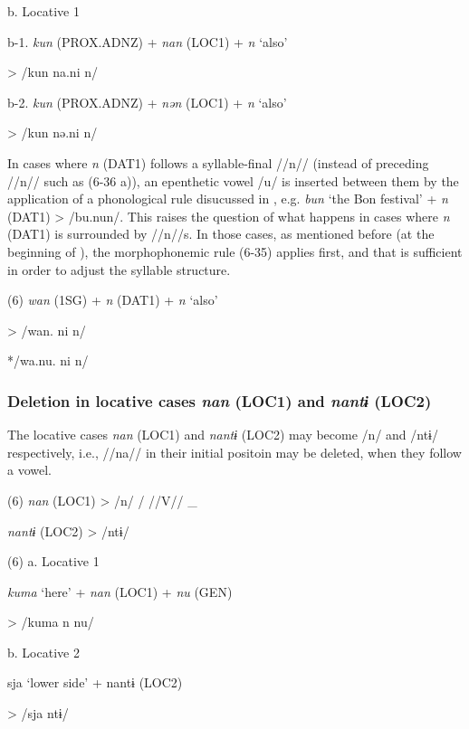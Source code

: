   b.  Locative 1

  b-1.  \textit{kun}  (PROX.ADNZ)  +  \textit{nan}  (LOC1)  +  \textit{n}  ‘also’

  >  /kun      na.ni      n/  

  b-2.  \textit{kun}  (PROX.ADNZ)  +  \textit{nən}  (LOC1)  +  \textit{n}  ‘also’

  >  /kun      nə.ni      n/  

In cases where \textit{n} (DAT1) follows a syllable-final //n// (instead of preceding //n// such as (6-36 a)), an epenthetic vowel /u/ is inserted between them by the application of a phonological rule disucussed in , e.g. \textit{bun} ‘the Bon festival’ + \textit{n} (DAT1) > /bu.nun/. This raises the question of what happens in cases where \textit{n} (DAT1) is surrounded by //n//s. In those cases, as mentioned before (at the beginning of ), the morphophonemic rule (6-35) applies first, and that is sufficient in order to adjust the syllable structure.

(6)    \textit{wan}  (1SG)  +  \textit{n}  (DAT1)  +  \textit{n}  ‘also’

  >  /wan.      ni      n/  

    */wa.nu.      ni      n/  

\subsubsection{Deletion in locative cases \textit{nan} (LOC1) and \textit{nantɨ} (LOC2)}

The locative cases \textit{nan} (LOC1) and \textit{nantɨ} (LOC2) may become /n/ and /ntɨ/ respectively, i.e., //na// in their initial positoin may be deleted, when they follow a vowel.

(6)  \textit{nan}  (LOC1)  >  %
/n/    /  //V//  \_

  \textit{nantɨ}  (LOC2)  >  /ntɨ/        

(6)  a.  Locative 1      

    \textit{kuma}  ‘here’  +  \textit{nan}  (LOC1)  +  \textit{nu}  (GEN)

  >  /kuma      n      nu/  

  b.  Locative 2      

    sja  ‘lower side’  +  nantɨ  (LOC2)      

  >  /sja      ntɨ/        

